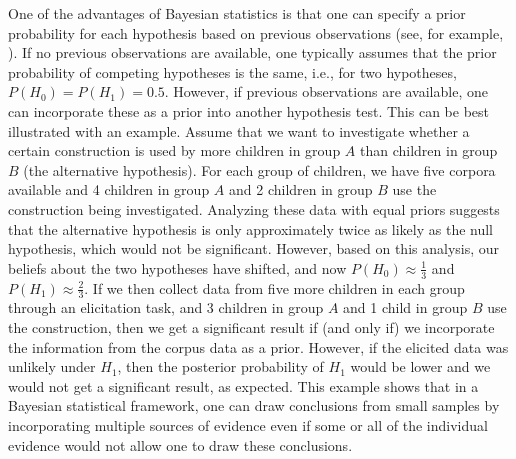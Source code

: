 \documentclass[lucida]{sp} %
\begin{document}
One of the advantages of Bayesian statistics is that one can specify a prior probability for each hypothesis based on previous observations (see, for example, \cite{efron2005}). If no previous observations are available, one typically assumes that the prior probability of competing hypotheses is the same, i.e., for two hypotheses, $P(H_0)=P(H_1)= 0.5$. However, if previous observations are available, one can incorporate these as a prior into another hypothesis test. This can be best illustrated with an example. Assume that we want to investigate whether a certain construction is used by more children in group $A$ than children in group $B$ (the alternative hypothesis). For each group of children, we have five corpora available and 4 children in group $A$ and 2 children in group $B$ use the construction being investigated. Analyzing these data with equal priors suggests that the alternative hypothesis is only approximately twice as likely as the null hypothesis, which would not be significant. However, based on this analysis, our beliefs about the two hypotheses have shifted, and now $P(H_0)\approx \frac{1}{3}$ and  $P(H_1)\approx \frac{2}{3}$. If we then collect data from five more children in each group through an elicitation task, and 3 children in group $A$ and 1 child in group $B$ use the construction, then we get a significant result if (and only if) we incorporate the information from the corpus data as a prior. However, if the elicited data was unlikely under $H_1$, then the posterior probability of $H_1$ would be lower and we would not get a significant result, as expected. This example shows that in a Bayesian statistical framework, one can draw conclusions from small samples by incorporating multiple sources of evidence even if some or all of the individual evidence would not allow one to draw these conclusions.

\end{document}
